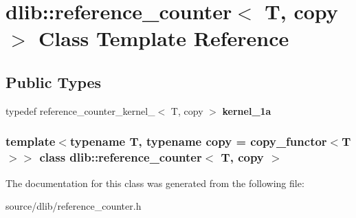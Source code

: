 \hypertarget{classdlib_1_1reference__counter}{
\section{dlib::reference\_\-counter$<$ T, copy $>$ Class Template Reference}
\label{classdlib_1_1reference__counter}
}
\subsection*{Public Types}
\begin{DoxyCompactItemize}
\item 
\hypertarget{classdlib_1_1reference__counter_ae560202b6aa896820016fa8e217e6091}{
typedef reference\_\-counter\_\-kernel\_$<$ T, copy $>$ {\bfseries kernel\_\-1a}}
\label{classdlib_1_1reference__counter_ae560202b6aa896820016fa8e217e6091}

\end{DoxyCompactItemize}
\subsubsection*{template$<$typename T, typename copy = copy\_\-functor$<$T$>$$>$ class dlib::reference\_\-counter$<$ T, copy $>$}



The documentation for this class was generated from the following file:\begin{DoxyCompactItemize}
\item 
source/dlib/reference\_\-counter.h\end{DoxyCompactItemize}
